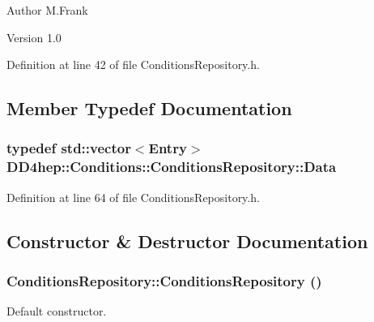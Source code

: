 \begin{DoxyAuthor}{Author}
M.Frank 
\end{DoxyAuthor}
\begin{DoxyVersion}{Version}
1.0 
\end{DoxyVersion}


Definition at line 42 of file ConditionsRepository.h.

\subsection{Member Typedef Documentation}
\hypertarget{class_d_d4hep_1_1_conditions_1_1_conditions_repository_a2a262d14363e0c6879677397dc595012}{
\subsubsection[{Data}]{\setlength{\rightskip}{0pt plus 5cm}typedef std::vector$<${\bf Entry}$>$ {\bf DD4hep::Conditions::ConditionsRepository::Data}}}
\label{class_d_d4hep_1_1_conditions_1_1_conditions_repository_a2a262d14363e0c6879677397dc595012}


Definition at line 64 of file ConditionsRepository.h.

\subsection{Constructor \& Destructor Documentation}
\hypertarget{class_d_d4hep_1_1_conditions_1_1_conditions_repository_aaf9d3a63aa6f596610104cbc1af2897a}{
\subsubsection[{ConditionsRepository}]{\setlength{\rightskip}{0pt plus 5cm}ConditionsRepository::ConditionsRepository ()}}
\label{class_d_d4hep_1_1_conditions_1_1_conditions_repository_aaf9d3a63aa6f596610104cbc1af2897a}


Default constructor. 

